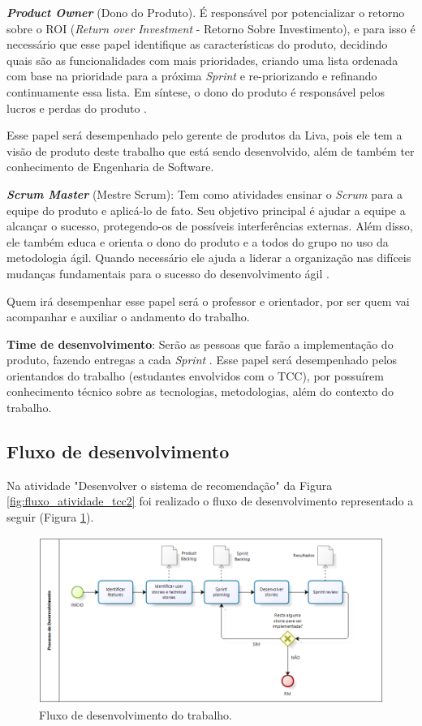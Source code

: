 \textbf{\textit{Product Owner}} (Dono do Produto). É responsável por potencializar o retorno sobre o ROI (\textit{Return over Investment} - Retorno Sobre Investimento), e para isso é necessário que esse papel identifique as características do produto, decidindo quais são as funcionalidades com mais prioridades, criando uma lista ordenada com base na prioridade para a próxima \textit{Sprint} e re-priorizando e refinando continuamente essa lista. Em síntese, o dono do produto é responsável pelos lucros e perdas do produto \cite{Sutherland}.

Esse papel será desempenhado pelo gerente de produtos da Liva, pois ele tem a visão de produto deste trabalho que está sendo desenvolvido, além de também ter conhecimento de Engenharia de Software.

\textbf{\textit{Scrum Master}} (Mestre Scrum): Tem como atividades ensinar o \textit{Scrum} para a equipe do produto e aplicá-lo de fato. Seu objetivo principal é ajudar a equipe a alcançar o sucesso, protegendo-os de possíveis interferências externas. Além disso, ele também educa e  orienta o dono do produto e a todos do grupo no uso da metodologia ágil. Quando necessário ele ajuda a liderar a organização nas difíceis mudanças fundamentais para o sucesso do desenvolvimento ágil \cite{Sutherland}.

Quem irá desempenhar esse papel será o professor e orientador, por ser quem vai acompanhar e auxiliar o andamento do trabalho.

\textbf{Time de desenvolvimento}: Serão as pessoas que farão a implementação do produto, fazendo entregas a cada \textit{Sprint} \cite{Sutherland}. Esse papel será desempenhado pelos orientandos do trabalho (estudantes envolvidos com o TCC), por possuírem conhecimento técnico sobre as tecnologias, metodologias, além do contexto do trabalho.

\subsection{Fluxo de desenvolvimento}
\label{fluxo_desenvol}

Na atividade "Desenvolver o sistema de recomendação" da Figura \ref{fig:fluxo_atividade_tcc2} foi realizado o fluxo de desenvolvimento representado a seguir (Figura \ref{fig:fluxo_scrum}).

\begin{figure}[H]
    \centering
    \includegraphics[scale=0.6]{figuras/proposta/fluxo_scrum.png}
    \caption[Fluxo de desenvolvimento do trabalho]{Fluxo de desenvolvimento do trabalho.}
    \label{fig:fluxo_scrum}
\end{figure}

